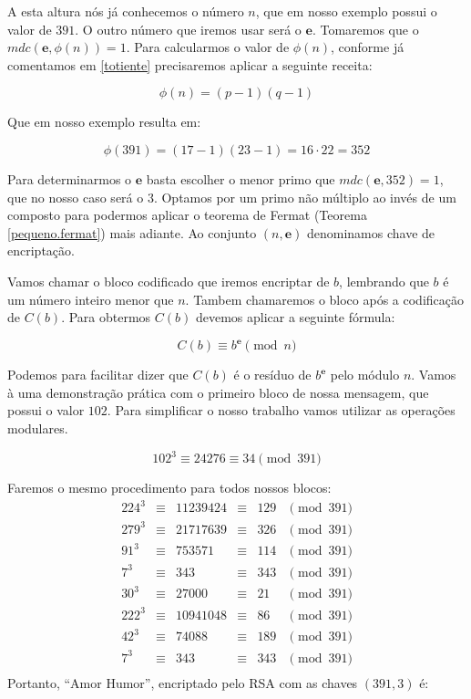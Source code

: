 A esta altura n\'os j\'a conhecemos o n\'umero $n$, que em nosso exemplo possui o valor de $391$. O outro n\'umero que iremos usar ser\'a o $\textbf{e}$. Tomaremos que o $mdc(\textbf{e}, \phi(n)) = 1$. Para calcularmos o valor de $\phi(n)$, conforme j\'a comentamos em \ref{totiente} precisaremos aplicar a seguinte receita:

$$\phi(n) = (p-1)(q-1)$$

Que em nosso exemplo resulta em:

$$\phi(391) = (17 - 1)(23 - 1) = 16 \cdot 22 = 352$$

Para determinarmos o $\textbf{e}$ basta escolher o menor primo que $mdc(\textbf{e}, 352) = 1$, que no nosso caso ser\'a o $3$. Optamos por um primo n\~ao m\'ultiplo ao inv\'es de um composto para podermos aplicar o teorema de Fermat  (Teorema \ref{pequeno.fermat}) mais adiante. Ao conjunto $(n, \textbf{e} )$ denominamos chave de encripta\c{c}\~ao.

Vamos chamar o bloco codificado que iremos encriptar de $b$, lembrando que $b$ \'e um n\'umero inteiro menor que $n$. Tambem chamaremos o bloco ap\'os a codifica\c{c}\~ao de $C(b)$. Para obtermos $C(b)$ devemos aplicar a seguinte f\'ormula:

$$C(b) \equiv b^\textbf{e} \pmod{n} $$

Podemos para facilitar dizer que $C(b)$ \'e o res\'iduo de $b^\textbf{e}$ pelo m\'odulo $n$. Vamos \`a uma demonstra\c{c}\~ao pr\'atica com o primeiro bloco de nossa mensagem, que possui o valor $102$. Para simplificar o nosso trabalho vamos utilizar as opera\c{c}\~oes modulares.

$$102^3 \equiv 24276 \equiv 34 \pmod{391}$$

Faremos o mesmo procedimento para todos nossos blocos:
\[
\begin{array}{cccccc}
224^3& \equiv& 11239424& \equiv& 129& \pmod{391}\\
279^3& \equiv& 21717639& \equiv& 326& \pmod{391}\\
91^3&  \equiv& 753571&   \equiv& 114& \pmod{391}\\
7^3&   \equiv& 343&      \equiv& 343& \pmod{391}\\
30^3&  \equiv& 27000&    \equiv& 21&  \pmod{391}\\
222^3& \equiv& 10941048& \equiv& 86&  \pmod{391}\\
42^3&  \equiv& 74088&    \equiv& 189& \pmod{391}\\
7^3&   \equiv& 343&      \equiv& 343& \pmod{391}\\
\end{array}
\]
Portanto, ``Amor Humor'', encriptado pelo RSA com as chaves $(391 , 3)$ \'e: 

